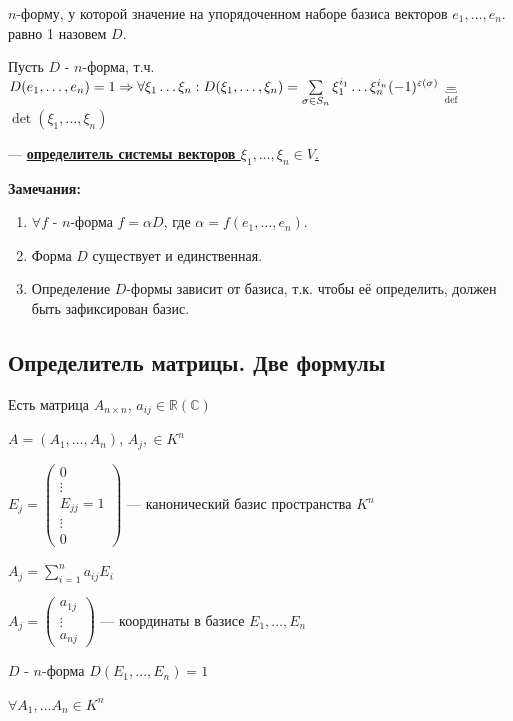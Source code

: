 \(n\)-форму, у которой значение на упорядоченном наборе базиса векторов \(e_1,\ldots,e_n\). равно 1 назовем \(D\).

Пусть \(D\) - \(n\)-форма, т.ч. \(D(e_1,\ldots,e_n) = 1 \newline \Rightarrow  \forall \xi_1 \ldots \xi_n: D(\xi_1,\ldots, \xi_n) = \sum\limits_{\sigma \in S_n} \xi_1^{i_1} \ldots \xi_n^{i_n} (-1)^{\varepsilon(\sigma)}\) $\underbracket{\text{=}}_{\text{def}}$ \(\det (\xi_1,\ldots, \xi_n)\)

--- \uline{\textbf{определитель системы векторов $\xi_1, \dots, \xi_n \in V$}.}

\textbf{Замечания:}
\begin{enumerate}
    \item \(\forall f\) - \(n\)-форма  \(f = \alpha D\), где \(\alpha = f(e_1,\ldots,e_n)\).
    \item Форма \(D\) существует и единственная.
    \item Определение \(D\)-формы зависит от базиса, т.к. чтобы её определить, должен быть зафиксирован базис.
\end{enumerate}

\subsection{Определитель матрицы. Две формулы}

Есть матрица \(A_{n\times n}\), \(a_{ij} \in \mathbb{R}(\mathbb{C})\)

\(A = (A_1, \ldots, A_n)\), \(A_j, \in K^n\)

\(E_j =
\begin{pmatrix}
    0          \\
    \vdots     \\
    E_{jj} = 1 \\
    \vdots     \\
    0
\end{pmatrix}\) --- канонический базис пространства $K^n$

\(A_j = \sum\limits_{i = 1}^n a_{ij} E_i\)

\(A_j =
\begin{pmatrix}
    a_{1j} \\
    \vdots \\
    a_{nj}
\end{pmatrix}\) --- координаты в базисе \(E_1, \ldots, E_n\)

\(D\) - \(n\)-форма \(D(E_1,\ldots, E_n) =1 \)

\(\forall A_1,\ldots A_n \in K^n \)

